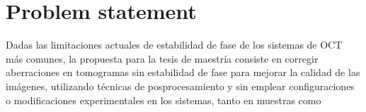 \newpage
{}
\chapter{Problem statement}

Dadas las limitaciones actuales de estabilidad de fase de los sistemas de OCT más comunes, la propuesta para la tesis de maestría consiste en corregir aberraciones en tomogramas sin estabilidad de fase para mejorar la calidad de las imágenes, utilizando técnicas de posprocesamiento y sin emplear configuraciones o modificaciones experimentales en los sistemas, tanto en muestras como
